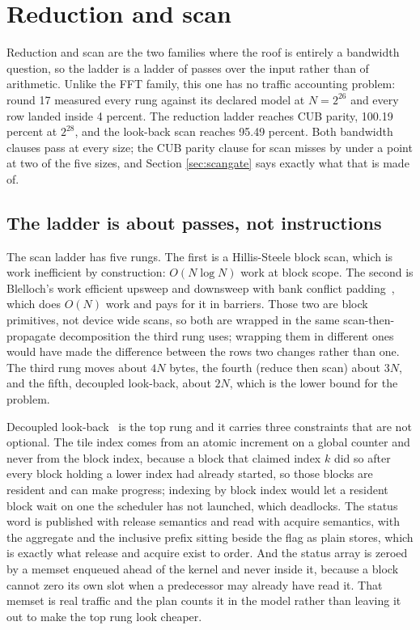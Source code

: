 \section{Reduction and scan}
\label{sec:scan}

Reduction and scan are the two families where the roof is entirely a bandwidth
question, so the ladder is a ladder of passes over the input rather than of
arithmetic. Unlike the FFT family, this one has no traffic accounting problem:
round 17 measured every rung against its declared model at $N = 2^{26}$ and every
row landed inside 4 percent. The reduction ladder reaches CUB parity, 100.19
percent at $2^{28}$, and the look-back scan reaches 95.49 percent. Both bandwidth
clauses pass at every size; the CUB parity clause for scan misses by under a point
at two of the five sizes, and Section \ref{sec:scangate} says exactly what that is
made of.

\subsection{The ladder is about passes, not instructions}

The scan ladder has five rungs. The first is a Hillis-Steele block scan, which is
work inefficient by construction: $O(N \log N)$ work at block scope. The second is
Blelloch's work efficient upsweep and downsweep with bank conflict
padding~\cite{blelloch1990}, which does $O(N)$ work and pays for it in barriers.
Those two are block primitives, not device wide scans, so both are wrapped in the
same scan-then-propagate decomposition the third rung uses; wrapping them in
different ones would have made the difference between the rows two changes rather
than one. The third rung moves about $4N$ bytes, the fourth (reduce then scan) about
$3N$, and the fifth, decoupled look-back, about $2N$, which is the lower bound for
the problem.

Decoupled look-back~\cite{merrill2016scan} is the top rung and it carries three
constraints that are not optional. The tile index comes from an atomic increment on
a global counter and never from the block index, because a block that claimed index
$k$ did so after every block holding a lower index had already started, so those
blocks are resident and can make progress; indexing by block index would let a
resident block wait on one the scheduler has not launched, which deadlocks. The
status word is published with release semantics and read with acquire semantics,
with the aggregate and the inclusive prefix sitting beside the flag as plain
stores, which is exactly what release and acquire exist to order. And the status
array is zeroed by a memset enqueued ahead of the kernel and never inside it,
because a block cannot zero its own slot when a predecessor may already have read
it. That memset is real traffic and the plan counts it in the model rather than
leaving it out to make the top rung look cheaper.

